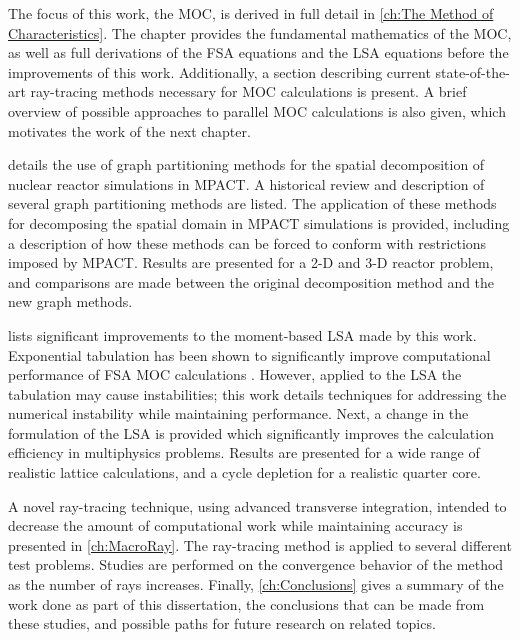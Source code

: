{{    The focus of this work, the \ac{MOC}, is derived in full detail in \cref{ch:The Method of Characteristics}.
    The chapter provides the fundamental mathematics of the \ac{MOC}, as well as full derivations of the \acf{FSA} equations and the \acf{LSA} equations before the improvements of this work.
    Additionally, a section describing current state-of-the-art ray-tracing methods necessary for \ac{MOC} calculations is present.
    A brief overview of possible approaches to parallel \ac{MOC} calculations is also given, which motivates the work of the next chapter.

     details the use of graph partitioning methods for the spatial decomposition of nuclear reactor simulations in MPACT.
    A historical review and description of several graph partitioning methods are listed.
    The application of these methods for decomposing the spatial domain in MPACT simulations is provided, including a description of how these methods can be forced to conform with restrictions imposed by MPACT.
    Results are presented for a 2-D and 3-D reactor problem, and comparisons are made between the original decomposition method and the new graph methods.

     lists significant improvements to the moment-based \acf{LSA} made by this work.
    Exponential tabulation has been shown to significantly improve computational performance of \ac{FSA} \ac{MOC} calculations \cite{Yamamoto2004}.
    However, applied to the \ac{LSA} the tabulation may cause instabilities; this work details techniques for addressing the numerical instability while maintaining performance.
    Next, a change in the formulation of the \ac{LSA} is provided which significantly improves the calculation efficiency in multiphysics problems.
    Results are presented for a wide range of realistic lattice calculations, and a cycle depletion for a realistic quarter core.

    A novel ray-tracing technique, using advanced transverse integration, intended to decrease the amount of computational work while maintaining accuracy is presented in \cref{ch:MacroRay}.
    The ray-tracing method is applied to several different test problems.
    Studies are performed on the convergence behavior of the method as the number of rays increases.
    Finally, \cref{ch:Conclusions} gives a summary of the work done as part of this dissertation, the conclusions that can be made from these studies, and possible paths for future research on related topics.
  }
  \printbibliography
}